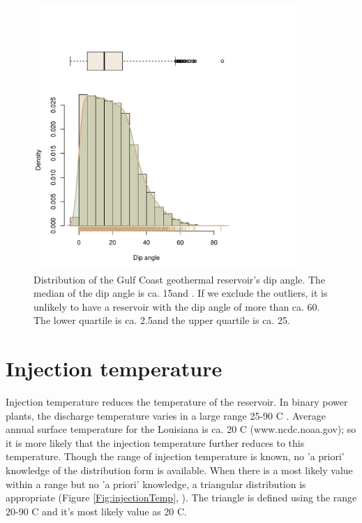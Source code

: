 \documentclass[review,authoryear, 12pt]{elsarticle}\usepackage[]{graphicx}\usepackage[]{color}
\newenvironment{knitrout}{}{} %
\begin{document}
\begin{knitrout}
\color{fgcolor}\begin{figure}[]


{\centering \includegraphics[width=10cm,height=10cm]{figure/dip_angle} 

}

\caption[Distribution of the Gulf Coast geothermal reservoir's dip angle]{Distribution of the Gulf Coast geothermal reservoir's dip angle. The median of the dip angle is ca. 15\degree and . If we exclude the outliers, it is unlikely to have a reservoir with the dip angle of more than ca. 60\degree. The lower quartile is ca. 2.5\degree and the upper quartile is ca. 25\degree.\label{Fig:dip_angle}}
\end{figure}


\end{knitrout}



\section{Injection temperature}
Injection temperature reduces the temperature of the reservoir. In binary power plants, the discharge temperature varies in a large range 25-90 \degree C \citep{tester2006future}. Average annual surface temperature for the Louisiana is ca. 20 \degree C (www.ncdc.noaa.gov); so it is more likely that the injection temperature further reduces to this temperature. Though the range of injection temperature is known, no 'a priori' knowledge of the distribution form is available. When there is a most likely value within a range but no 'a priori' knowledge, a triangular distribution is appropriate (Figure \ref{Fig:injectionTemp}, \citet{jensen2000statistics}). The triangle is defined using the range 20-90 \degree C and it's most likely value as 20 \degree C.
\end{document}
